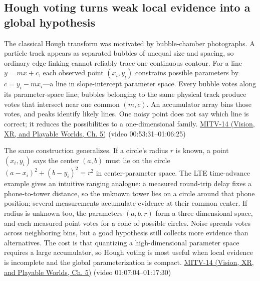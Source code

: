\subsection{Hough voting turns weak local evidence into a global hypothesis}\label{04-visual-computing-ii-ch030-hough-voting-turns-weak-local-evidence-into-a-global-hypothesis}

\hypertarget{04-visual-computing-ii-ch030-hough-voting-turns-weak-local-evidence-into-a-global-hypothesis}{}

The classical Hough transform was motivated by bubble-chamber photographs. A particle track appears as separated bubbles of unequal size and spacing, so ordinary edge linking cannot reliably trace one continuous contour. For a line \(y=mx+c\), each observed point \((x_i,y_i)\) constrains possible parameters by \(c=y_i-mx_i\)---a line in slope-intercept parameter space. Every bubble votes along its parameter-space line; bubbles belonging to the same physical track produce votes that intersect near one common \((m,c)\). An accumulator array bins those votes, and peaks identify likely lines. One noisy point does not say which line is correct; it reduces the possibilities to a one-dimensional family. \href{../07-Vision-XR-and-Playable-Worlds/main.pdf\#nameddest=04-visual-computing-ii-ch036-mitv-14---inspection-in-patquick-hough-transform-homography-position-determination-multi-scale}{MITV-14 (Vision, XR, and Playable Worlds, Ch. 5)} (video 00:53:31--01:06:25)

The same construction generalizes. If a circle's radius \(r\) is known, a point \((x_i,y_i)\) says the center \((a,b)\) must lie on the circle \((a-x_i)^2+(b-y_i)^2=r^2\) in center-parameter space. The LTE time-advance example gives an intuitive ranging analogue: a measured round-trip delay fixes a phone-to-tower distance, so the unknown tower lies on a circle around that phone position; several measurements accumulate evidence at their common center. If radius is unknown too, the parameters \((a,b,r)\) form a three-dimensional space, and each measured point votes for a cone of possible circles. Noise spreads votes across neighboring bins, but a good hypothesis still collects more evidence than alternatives. The cost is that quantizing a high-dimensional parameter space requires a large accumulator, so Hough voting is most useful when local evidence is incomplete and the global parameterization is compact. \href{../07-Vision-XR-and-Playable-Worlds/main.pdf\#nameddest=04-visual-computing-ii-ch036-mitv-14---inspection-in-patquick-hough-transform-homography-position-determination-multi-scale}{MITV-14 (Vision, XR, and Playable Worlds, Ch. 5)} (video 01:07:04--01:17:30)

